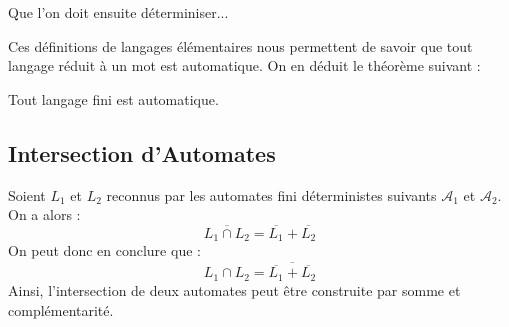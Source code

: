 \begin{example}
\begin{center}
\begin{minipage}{0.45\textwidth}
        \end{minipage}%
        \hfill 
        \begin{minipage}{0.45\textwidth}
        \end{minipage}
    \end{center}

    Que l'on doit ensuite déterminiser... 
\end{example}

Ces définitions de langages élémentaires nous permettent de savoir que tout langage réduit à un mot est automatique. 
On en déduit le théorème suivant : 

\begin{theorem}
    Tout langage fini est automatique. 
\end{theorem}


\subsection{Intersection d'Automates}

\begin{proposition}
    Soient $L_1$ et $L_2$ reconnus par les automates fini déterministes suivants $ \mathcal{A}_1$ et $ \mathcal{A}_2$. 
    On a alors : 
        \[ \overline{L_1 \cap L_2} = \overline{L_1} + \overline{L_2} \]
    On peut donc en conclure que : 
        \[ \boxed{L_1 \cap L_2 = \overline{\overline{L_1} + \overline{L_2}}} \]  
    Ainsi, l'intersection de deux automates peut être construite par somme et complémentarité. 
\end{proposition}

